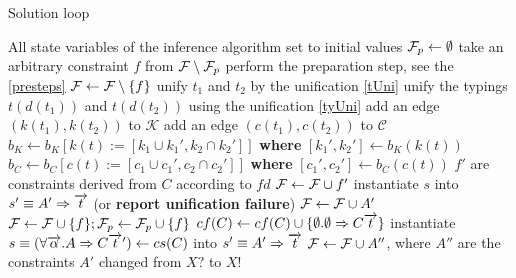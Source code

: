 \begin{algorithm}
    \small
    \caption{Solution loop}
    \label{main_loop}
    \begin{algorithmic}
        \Require All state variables of the inference algorithm set to initial values
        \State $\mathcal F_p \gets \emptyset$ 
            \State take an arbitrary constraint $f$ from $\mathcal F \setminus \mathcal F_p$
            \State perform the preparation step, see the \cref{presteps}
            \State $\mathcal F \gets \mathcal F \setminus \{f\}$ 
                \State unify $t_1$ and $t_2$ by the unification \ref{tUni}
                \State unify the typings $t (d (t_1))$ and $t (d (t_2))$ using the unification \ref{tyUni}
                \State add an edge $(k(t_1), k(t_2))$ to $\mathcal{K}$
                \State add an edge $(c(t_1), c(t_2))$ to $\mathcal{C}$
                \State $b_K \gets b_K[ k(t) := [k_1 \cup k_1', k_2 \cap k_2'] ]$ \textbf{where} $[k_1', k_2'] \gets b_K(k(t))$
                \State $b_C \gets b_C[ c(t) := [c_1 \cup c_1', c_2 \cap c_2'] ]$ \textbf{where} $[c_1', c_2'] \gets b_C(c(t))$
                    \State $f'$ are constraints derived from $C$ according to $fd$
                    \State $\mathcal F \gets \mathcal F \cup f'$
                    \State instantiate $s$ into $s' \equiv A' \Rightarrow \overrightarrow{t}$ (or \textbf{report unification failure})
                    \State $\mathcal F \gets \mathcal F \cup A'$
                \Else
                    \State $\mathcal F \gets \mathcal F \cup \{f\}; \mathcal F_p \gets \mathcal F_p \cup \{f\}$ 
                \EndIf
                \State $cf(C) \gets cf(C) \cup \{\emptyset . \emptyset \Rightarrow C \overrightarrow{t}\} $
                \State instantiate $s \equiv (\forall \overrightarrow{\alpha} . A \Rightarrow C \overrightarrow{t}') \gets cs(C)$ into $s' \equiv A' \Rightarrow \overrightarrow{t}$
                \State $\mathcal F \gets \mathcal F \cup A''$, where $A''$ are the constraints $A'$ changed from $X?$ to $X!$

\end{algorithmic}
\end{algorithm}
